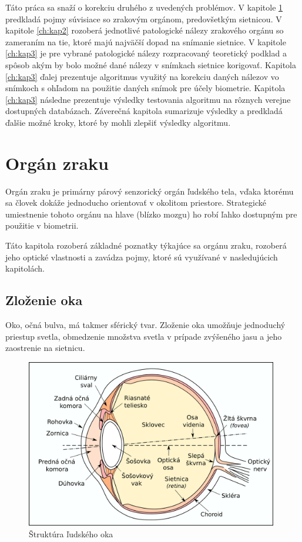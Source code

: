 Táto práca sa snaží o korekciu druhého z uvedených problémov. V kapitole \ref{ch:kap1} predkladá pojmy súvisiace so zrakovým orgánom, predovšetkým sietnicou. V kapitole \ref{ch:kap2} rozoberá jednotlivé patologické nálezy zrakového orgánu so zameraním na tie, ktoré majú najväčší dopad na snímanie sietnice. V kapitole \ref{ch:kap3} je pre vybrané patologické nálezy rozpracovaný teoretický podklad a spôsob akým by bolo možné dané nálezy v snímkach sietnice korigovať. Kapitola \ref{ch:kap3} ďalej prezentuje algoritmus využitý na korekciu daných nálezov vo snímkoch s ohľadom na použitie daných snímok pre účely biometrie. Kapitola \ref{ch:kap3} následne prezentuje výsledky testovania algoritmu na rôznych verejne dostupných databázach. Záverečná kapitola sumarizuje výsledky a predkladá ďalšie možné kroky, ktoré by mohli zlepšiť výsledky algoritmu.

\chapter{Orgán zraku}\label{ch:kap1}
Orgán zraku je primárny párový senzorický orgán ľudského tela, vďaka ktorému sa človek dokáže jednoducho orientovať v okolitom priestore. Strategické umiestnenie tohoto orgánu na hlave (blízko mozgu) ho robí ľahko dostupným pre použitie v biometrii.

Táto kapitola rozoberá základné poznatky týkajúce sa orgánu zraku, rozoberá jeho optické vlastnosti a zavádza pojmy, ktoré sú využívané v nasledujúcich kapitolách.

\section{Zloženie oka}\label{sec:oko}
Oko, očná bulva, má takmer sférický tvar. Zloženie oka umožňuje jednoduchý priestup svetla, obmedzenie množstva svetla v prípade zvýšeného jasu a jeho zaostrenie na sietnicu.

\begin{figure}[h]
  \centering
  \includegraphics[width=11cm]{img/Eyesection.png}
  \caption{Štruktúra ľudského oka\cite{retina}}
\end{figure}

